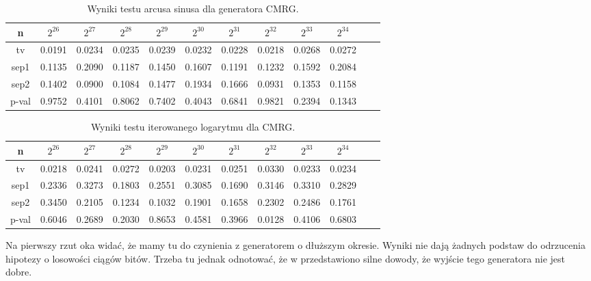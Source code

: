 \documentclass[a4paper,11pt,twoside]{book}
\theoremstyle{definition}
\begin{document}
\begin{table}[ht!]
\centering
 \caption{Wyniki testu arcusa sinusa dla generatora CMRG.}
 \label{tab:cmrg_asin}
\begin{tabular} {||c|c|c|c|c|c|c|c|c|c|c|c||}  
 \hline
     n &  $2^{26}$ &  $2^{27}$ &  $2^{28}$ &  $2^{29}$ &  $2^{30}$ &  $2^{31}$ &  $2^{32}$ &  $2^{33}$ &  $2^{34}$\\ \hline
     tv &  0.0191 &  0.0234 &  0.0235 &  0.0239 &  0.0232 &  0.0228 &  0.0218 &  0.0268 &  0.0272\\ \hline
   sep1 &  0.1135 &  0.2090 &  0.1187 &  0.1450 &  0.1607 &  0.1191 &  0.1232 &  0.1592 &  0.2084\\ \hline
   sep2 &  0.1402 &  0.0900 &  0.1084 &  0.1477 &  0.1934 &  0.1666 &  0.0931 &  0.1353 &  0.1158\\ \hline
  p-val &  0.9752 &  0.4101 &  0.8062 &  0.7402 &  0.4043 &  0.6841 &  0.9821 &  0.2394 &  0.1343\\ \hline
\end{tabular}  
\end{table}
\begin{table}[ht!]
\centering
 \caption{Wyniki testu iterowanego logarytmu dla CMRG.}
 \label{tab:cmrg_lil}
\begin{tabular} {||c|c|c|c|c|c|c|c|c|c|c|c||}  
 \hline 
     n &  $2^{26}$ &  $2^{27}$ &  $2^{28}$ &  $2^{29}$ &  $2^{30}$ &  $2^{31}$ &  $2^{32}$ &  $2^{33}$ &  $2^{34}$\\ \hline
     tv &  0.0218 &  0.0241 &  0.0272 &  0.0203 &  0.0231 &  0.0251 &  0.0330 &  0.0233 &  0.0234\\ \hline
   sep1 &  0.2336 &  0.3273 &  0.1803 &  0.2551 &  0.3085 &  0.1690 &  0.3146 &  0.3310 &  0.2829\\ \hline
   sep2 &  0.3450 &  0.2105 &  0.1234 &  0.1032 &  0.1901 &  0.1658 &  0.2302 &  0.2486 &  0.1761\\ \hline
  p-val &  0.6046 &  0.2689 &  0.2030 &  0.8653 &  0.4581 &  0.3966 &  0.0128 &  0.4106 &  0.6803\\ \hline
\end{tabular}  
\end{table}
\FloatBarrier

  Na pierwszy rzut oka widać, że mamy tu do czynienia z generatorem o dłuższym okresie. Wyniki nie dają żadnych podstaw do odrzucenia hipotezy o losowości ciągów bitów. Trzeba tu jednak odnotować, że w \cite{kim-choe} przedstawiono silne dowody, że wyjście tego generatora nie jest dobre.

\FloatBarrier
\end{document}
